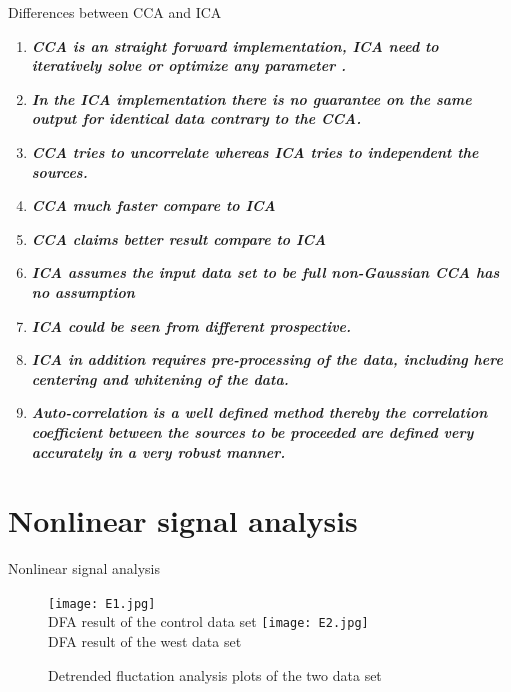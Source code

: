\documentclass[t,12pt,english
\ifx\beamermode\undefined\else,\beamermode\fi
]{beamer}
\begin{document}
\begin{frame}{Differences between CCA and ICA}


\begin{block}{\footnotesize{}}\tiny{}
\begin{enumerate} 
\vspace{0.05cm}
     \item \tiny{\textbf{\textit{CCA is an straight forward implementation, ICA need to iteratively solve or optimize any parameter \cite{17}.}}} 
     \item \tiny{\textbf{\textit{In the ICA implementation there is no guarantee on the same output for identical data contrary to the CCA\cite{15}.}}} 
     \item \tiny{\textbf{\textit{CCA tries to uncorrelate  whereas ICA tries to independent the sources.}}} 
     \item \tiny{\textbf{\textit{CCA much faster compare to ICA}}}
     \item \tiny{\textbf{\textit{CCA claims better result compare to ICA}}} 
     \item \tiny{\textbf{\textit{ICA assumes the input data set to be full non-Gaussian CCA has no assumption}}} 
     \item \tiny{\textbf{\textit{ICA could be seen from different prospective.}}} 
     \item \tiny{\textbf{\textit{ICA in addition requires pre-processing  of the data, including here centering and whitening of the data.}}} 
     \item \tiny{\textbf{\textit{Auto-correlation is a well defined method thereby the correlation coefficient between the sources to be proceeded are defined very accurately in a very robust manner.}}} 

     
\end{enumerate}
\end{block}
     
   
\end{frame} 
    
    
    
    

\section{Nonlinear signal analysis}\label{Second-section}    
    
\begin{frame}{Nonlinear signal analysis}

\begin{figure}[!htbp]
%
\centering
\texttt{[image: E1.jpg]}\\
\tiny{DFA result of the control data set}\label{figa}
\endminipage\hfill
{}%
\centering
\texttt{[image: E2.jpg]}\\
\tiny{DFA result of the west data set}\label{figb}
\endminipage\hfill
\caption{\tiny Detrended fluctation analysis plots of the two data set}
\end{figure}
   
\end{frame}    
    
\end{document}
